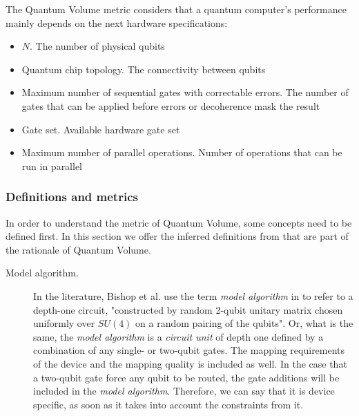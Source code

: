 \documentclass[11pt]{article}
\begin{document}
The Quantum Volume metric considers that a quantum computer's performance mainly depends on the next hardware specifications:

\begin{itemize}
\item \(N\). The number of physical qubits
\item Quantum chip topology. The connectivity between qubits
\item Maximum number of sequential gates with correctable errors. The number of gates that can be applied before errors or decoherence mask the result
\item Gate set. Available hardware gate set
\item Maximum number of parallel operations. Number of operations that can be run in parallel
\end{itemize}

\subsubsection{Definitions and metrics}
\label{sec:org647f540}

In order to understand the metric of Quantum Volume, some concepts need to be defined first. 
In this section we offer the inferred definitions from \cite{Bishop_2017,Moll_2018} that are part of the rationale of Quantum Volume.


\begin{description}
\item[{Model algorithm.}] In the literature, Bishop et al. use the term \emph{model algorithm} in \cite{Bishop_2017} to refer to a depth-one circuit, "constructed by random 2-qubit unitary matrix chosen uniformly over \(SU (4)\) on a random pairing of the qubits". Or, what is the same, the \emph{model algorithm} is a \emph{circuit unit} of depth one defined by a combination of any single- or two-qubit gates. The mapping requirements of the device and the mapping quality is included as well. In the case that a two-qubit gate force any qubit to be routed, the gate additions will be included in the \emph{model algorithm}. Therefore, we can say that it is device specific, as soon as it takes into account the constraints from it.
\end{description}
\end{document}
